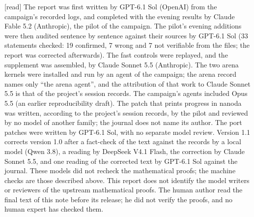 \documentclass[11pt,a4paper]{article}
\theoremstyle{plain}
\theoremstyle{definition}
\theoremstyle{remark}
\numberwithin{equation}{section}
\newcommand{\st}[1]{\textsf{[#1]}}
\begin{document}
\st{read} The report was first written by GPT-6.1 Sol (OpenAI) from the campaign's recorded logs, and completed with the evening results by
Claude Fable 5.2 (Anthropic), the pilot of the campaign. The pilot's evening additions were then audited sentence by sentence against their sources by GPT-6.1 Sol (33 statements checked: 19 confirmed,
7 wrong and 7 not verifiable from the files; the report was corrected afterwards).
The fast controls were replayed, and the supplement was assembled, by Claude Sonnet 5.5 (Anthropic). The two arena kernels were installed and run by an agent of the campaign; the arena record names only ``the arena agent'', and the attribution of that work to Claude Sonnet 5.5 is that of the project's session records. The campaign's agents included Opus 5.5 (an earlier reproducibility draft). The patch that prints progress in nanoda
was written, according to the project's session records, by the pilot and reviewed by no model of another family; the journal does not name its author. The port patches were written by GPT-6.1 Sol, with no separate model review.
Version 1.1 corrects version 1.0 after a fact-check of the text against the records by a local model (Qwen 3.8), a reading by DeepSeek V4.1 Flash, the correction by Claude Sonnet 5.5, and one reading of the corrected text by GPT-6.1 Sol against the journal.
These models did not recheck the mathematical proofs; the machine checks are those described above.
This report does not identify the model writers or reviewers of the upstream mathematical proofs.
The human author read the final text of this note before its release; he did not verify the proofs, and no human expert has checked them.
\end{document}
